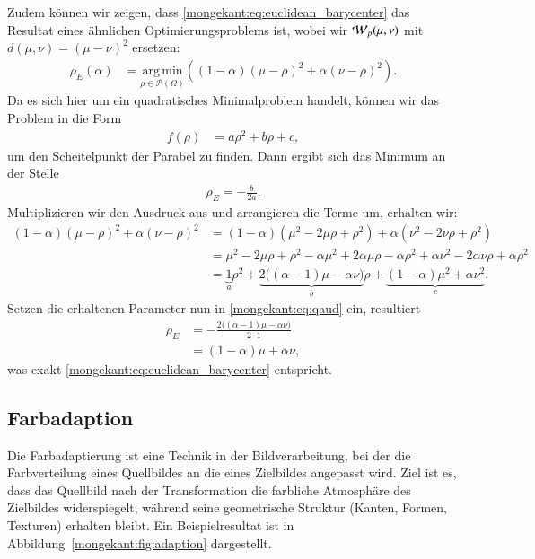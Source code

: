 Zudem können wir zeigen,
dass \eqref{mongekant:eq:euclidean_barycenter} das Resultat eines ähnlichen Optimierungsproblems ist,
wobei wir $\wasserstein(\mu, \nu)$ mit $d(\mu, \nu) = (\mu - \nu)^2$ ersetzen:
\begin{align*}
\rho_E(\alpha)
&=
\underset{\rho \in \mathcal{P}(\Omega)}{\mathrm{arg\,min}}\left(
(1-\alpha) (\mu - \rho)^2
+ \alpha (\nu - \rho)^2
\right)
.
\end{align*}
Da es sich hier um ein quadratisches Minimalproblem handelt,
können wir das Problem in die Form
\begin{align*}
f(\rho)
&=
a \rho^2 + b \rho + c
,
\end{align*}
um den Scheitelpunkt der Parabel zu finden.
Dann ergibt sich das Minimum an der Stelle
\begin{align}
\rho_E
=
-\frac{b}{2a}
\label{mongekant:eq:qaud}
.
\end{align}
Multiplizieren wir den Ausdruck aus und 
arrangieren die Terme um,
erhalten wir:
\begin{align*}
(1 - \alpha) (\mu - \rho)^2 
+ \alpha (\nu - \rho)^2
&=
(1 - \alpha) \left(\mu^2 - 2\mu\rho + \rho^2 \right)
+ \alpha \left(\nu^2 - 2\nu\rho + \rho^2 \right)
\\
&=
\mu^2 - 2\mu\rho + \rho^2 - \alpha \mu^2 + 2\alpha\mu\rho - \alpha\rho^2 
+ \alpha \nu^2 - 2\alpha\nu\rho + \alpha\rho^2
\\
&=
\underbrace{1}_{\displaystyle a} \rho^2 
+ \underbrace{2 \bigl((\alpha - 1) \mu - \alpha\nu \bigr)}_{\displaystyle b} \rho
+ \underbrace{(1 - \alpha) \mu^2 + \alpha \nu^2}_{\displaystyle c}
.
\end{align*}
Setzen die erhaltenen Parameter nun in \eqref{mongekant:eq:qaud} ein,
resultiert
\begin{align*}
\rho_E
&=
-\frac{2 \bigl(\left(\alpha - 1\right) \mu - \alpha\nu \bigr)}{2 \cdot 1}
\\
&=
(1 - \alpha) \mu + \alpha \nu
,
\end{align*}
was exakt \eqref{mongekant:eq:euclidean_barycenter} entspricht.

\subsection{Farbadaption\label{mongekant:subsection:farbadaption}}

Die Farbadaptierung ist eine Technik in der Bildverarbeitung,
bei der die Farbverteilung eines Quellbildes an die eines Zielbildes angepasst wird.
Ziel ist es,
dass das Quellbild nach der Transformation
die farbliche Atmosphäre des Zielbildes widerspiegelt,
während seine geometrische Struktur (Kanten, Formen, Texturen) erhalten bleibt.
Ein Beispielresultat ist in Abbildung~\ref{mongekant:fig:adaption} dargestellt.

